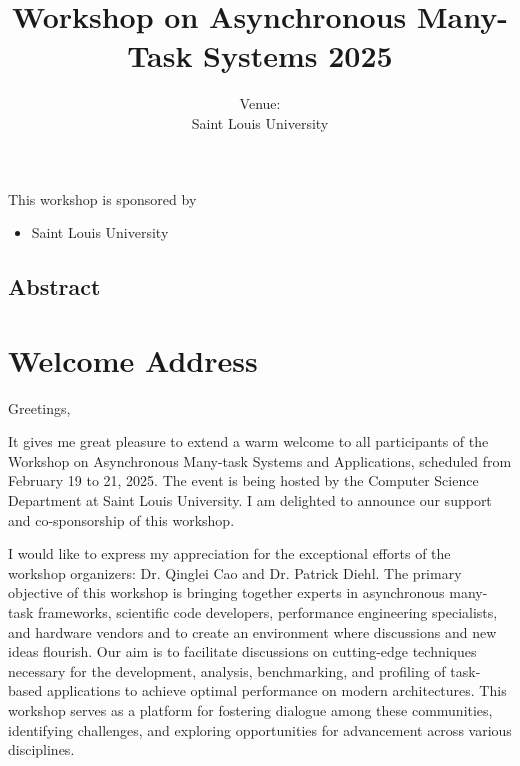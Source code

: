 \documentclass[12pt,letterpaper]{book}
\title{Workshop on Asynchronous Many-Task Systems 2025}
\author{Venue: \\ Saint Louis University}
\begin{document}
\frontmatter

\maketitle

This workshop is sponsored by

\begin{itemize}
\item Saint Louis University 
\end{itemize}

\newpage

\section*{Abstract}


\chapter{Welcome Address}


Greetings,

\vspace{1ex}

\noindent It gives me great pleasure to extend a warm welcome to all participants of the Workshop on Asynchronous Many-task Systems and Applications, scheduled from February 19 to 21, 2025. The event is being hosted by the Computer Science Department at Saint Louis University. I am delighted to announce our support and co-sponsorship of this workshop.

\vspace{1ex}

\noindent I would like to express my appreciation for the exceptional efforts of the workshop organizers: Dr. Qinglei Cao and Dr. Patrick Diehl. The primary objective of this workshop is bringing together experts in asynchronous many-task frameworks, scientific code developers, performance engineering specialists, and hardware vendors and to create an environment where discussions and new ideas flourish. Our aim is to facilitate discussions on cutting-edge techniques necessary for the development, analysis, benchmarking, and profiling of task-based applications to achieve optimal performance on modern architectures. This workshop serves as a platform for fostering dialogue among these communities, identifying challenges, and exploring
opportunities for advancement across various disciplines.
\end{document}
